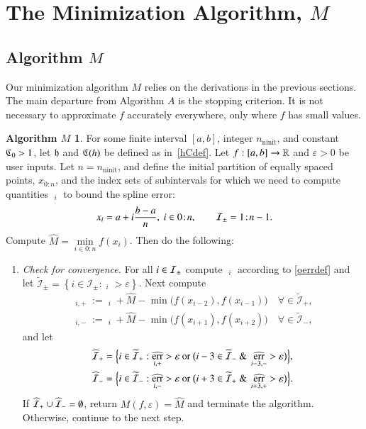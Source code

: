 \documentclass[review]{elsarticle}
\newcommand{\abstol}{\varepsilon}
\newcommand{\zton}{0\!:\!n}
\theoremstyle{definition}
\newtheorem*{algoM}{Algorithm $M$}
\newcommand{\hM}{\widehat{M}}
\DeclareMathOperator{\ninit}{ninit}
\DeclareMathOperator{\oerr}{\overline{err}}
\DeclareMathOperator{\herr}{\widehat{err}}
\newcommand{\minfi}{\min\limits_{i \in 0:n} f(x_i)} %
\begin{document}
\section{The Minimization Algorithm, $M$} \label{sec:funmin}

\subsection{Algorithm $M$}  \label{sec:minalgo}
Our minimization algorithm $M$ relies on the derivations in the previous
sections. The main departure from Algorithm $A$ is the stopping criterion. It is
not necessary to approximate $f$ accurately everywhere, only where $f$ has small
values.

\begin{algoM} \label{AlgoM}
	For some finite interval $[a,b]$, integer $n_{\ninit}$, and constant $\mathfrak{C}_0 > 1$, let $\mathfrak{h}$ and $\mathfrak{C}(h)$ be defined as in~\eqref{hCdef}.  Let $f:[a,b] \to \mathbb{R}$ and $\abstol >0$ be user inputs. Let
	$n=n_{\ninit}$, and define the initial partition of equally spaced points, $x_{0:n}$, and the index sets of subintervals for which we need to compute quantities $\oerr_{i}$ to bound the spline error:
\[
x_i=a+ i\frac{b-a}{n}, \ i \in \zton, \qquad \ci_{\pm} =  1\!:\!n-1.
\]
	Compute $\hM= \minfi$.  
	Then do the
	following:
	
	\begin{enumerate}[\em Step 1.]%
		
		\item \label{stagemin1} \emph{Check for convergence.} For all $i \in \mathcal{I}_{\pm}$ compute $\oerr_i $ according to \eqref{oerrdef} and let $\widetilde{\mathcal{I}}_{\pm} = \left\{i \in \mathcal{I}_{\pm}: \oerr_i  > \abstol \right\}$.  Next compute
		\begin{gather*}
		\herr_{i,+} := \oerr_i + \hM - \min\bigl(f(x_{i - 2}),f(x_{i-1})\bigr) \quad \forall \in \widetilde{\mathcal{I}}_{+}, \\
		\herr_{i,-} := \oerr_i + \hM - \min\bigl(f(x_{i +1}),f(x_{i+2})\bigr)  \quad \forall \in \widetilde{\mathcal{I}}_{-},		
		\end{gather*}
		and let 
		\begin{gather*}
				\widehat{\ci}_+ = \Bigl\{i \in \widetilde{\ci}_+:  \herr_{i,+} > \abstol \text{ or } \bigl( i-3 \in \widetilde{\ci}_- \text{ \& } \herr_{i-3,-} > \abstol \bigr) \Bigr\}, \\
				\widehat{\ci}_- = \Bigl\{i \in \widetilde{\ci}_-: \herr_{i,-} > \abstol \text{ or } \bigl( i+3\in \widetilde{\ci}_+ \text{ \& } \herr_{i+3,+} > \abstol \bigr) \Bigr\}.
		\end{gather*}
		If $\widehat{\mathcal{I}}_+ \cup \widehat{\mathcal{I}}_- =
		\emptyset$, return $M(f,\abstol) = \widehat{M}$ and terminate the algorithm.
		Otherwise, continue to the next step.
		

\end{enumerate}
\end{algoM}
\end{document}
